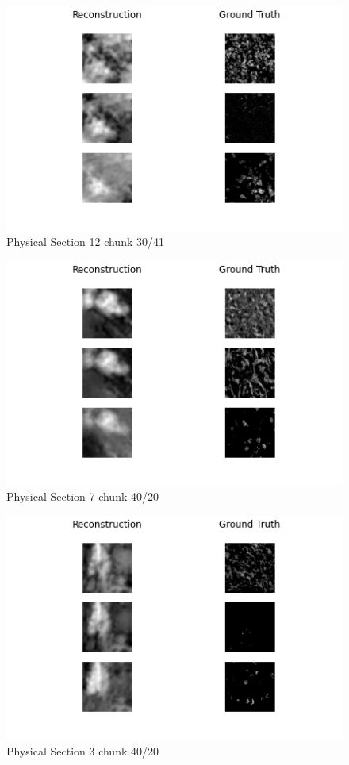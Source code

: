 \documentclass[10pt,twocolumn,letterpaper]{article}
\begin{document}
\begin{figure}
	\centering
	\captionsetup{justification=centering}
		\hspace*{-0.2cm}	
		\includegraphics[scale=0.35]{../figures/12_30_41.png}
	\caption{Physical Section 12 chunk 30/41}		
\end{figure}

\begin{figure}
	\centering
	\captionsetup{justification=centering}
		\hspace*{-0.2cm}	
		\includegraphics[scale=0.35]{../figures/7_40_20.png}
	\caption{Physical Section 7 chunk 40/20}		
\end{figure}

\begin{figure}
	\centering
	\captionsetup{justification=centering}
		\hspace*{-0.2cm}	
		\includegraphics[scale=0.35]{../figures/3_40_20.png}
	\caption{Physical Section 3 chunk 40/20}		
\end{figure}
\end{document}
